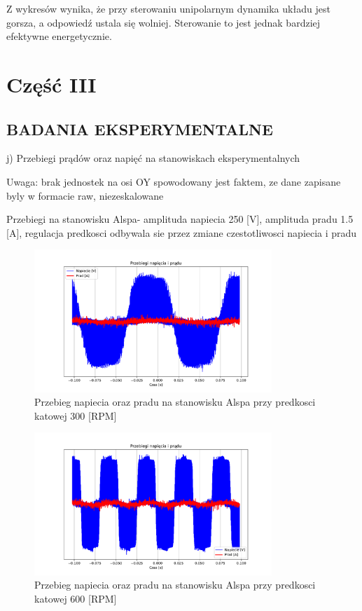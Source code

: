 \documentclass[11pt]{article}
\begin{document}
Z wykresów wynika, że przy sterowaniu unipolarnym dynamika układu jest gorsza, a odpowiedź ustala się wolniej. Sterowanie to jest jednak bardziej efektywne energetycznie.

\section{Część III}

\subsection{BADANIA EKSPERYMENTALNE}

j) Przebiegi prądów oraz napięć na stanowiskach eksperymentalnych

Uwaga: brak jednostek na osi OY spowodowany jest faktem, ze dane
zapisane byly w formacie raw, niezeskalowane

Przebiegi na stanowisku Alspa- amplituda napiecia 250 [V], amplituda pradu 1.5 [A], regulacja predkosci odbywala sie przez zmiane czestotliwosci napiecia i pradu

\begin{figure}[H]
\centering
\includegraphics[width=0.8\textwidth]{aun1_alspa_rpm300.pdf}
\caption{Przebieg napiecia oraz pradu na stanowisku Alspa przy predkosci katowej 300 [RPM]}
\end{figure}

\begin{figure}[H]
\centering
\includegraphics[width=0.8\textwidth]{aun1_alspa_rpm600.pdf}
\caption{Przebieg napiecia oraz pradu na stanowisku Alspa przy predkosci katowej 600 [RPM]}
\end{figure}
\end{document}
